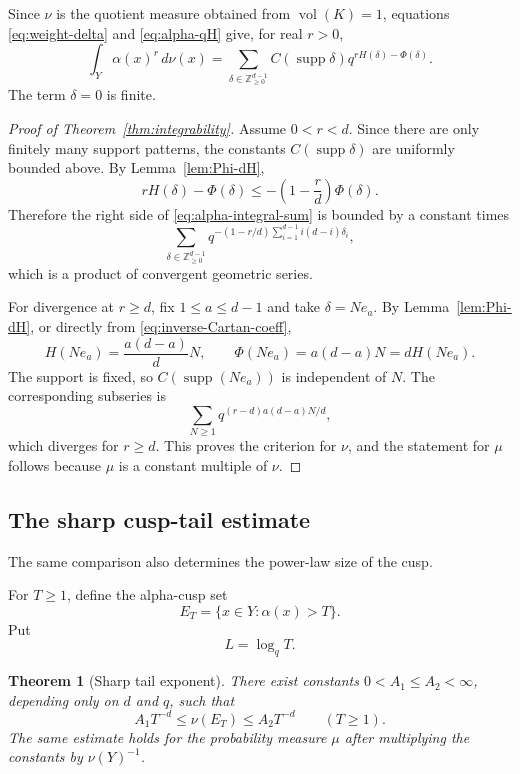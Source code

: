 \documentclass[11pt]{amsart}
\newcommand{\ZZ}{\mathbb Z}
\newcommand{\vol}{\operatorname{vol}}
\newcommand{\supp}{\operatorname{supp}}
\theoremstyle{plain}
\newtheorem{theorem}{Theorem}[section]
\theoremstyle{definition}
\numberwithin{equation}{section}
\begin{document}
Since $\nu$ is the quotient measure obtained from $\vol(K)=1$, equations
\eqref{eq:weight-delta} and \eqref{eq:alpha-qH} give, for real $r>0$,
\begin{equation}\label{eq:alpha-integral-sum}
  \int_Y\alpha(x)^r\,d\nu(x)
  =
  \sum_{\delta\in\ZZ_{\ge0}^{d-1}}
  C(\supp\delta)q^{rH(\delta)-\Phi(\delta)}.
\end{equation}
The term $\delta=0$ is finite.

\begin{proof}[Proof of Theorem~\ref{thm:integrability}]
Assume $0<r<d$.  Since there are only finitely many support patterns, the constants
$C(\supp\delta)$ are uniformly bounded above.  By Lemma~\ref{lem:Phi-dH},
\[
  rH(\delta)-\Phi(\delta)
  \le -\left(1-\frac rd\right)\Phi(\delta).
\]
Therefore the right side of \eqref{eq:alpha-integral-sum} is bounded by a constant times
\[
  \sum_{\delta\in\ZZ_{\ge0}^{d-1}}
  q^{-(1-r/d)\sum_{i=1}^{d-1}i(d-i)\delta_i},
\]
which is a product of convergent geometric series.

For divergence at $r\ge d$, fix $1\le a\le d-1$ and take $\delta=Ne_a$.  By
Lemma~\ref{lem:Phi-dH}, or directly from \eqref{eq:inverse-Cartan-coeff},
\[
  H(Ne_a)=\frac{a(d-a)}dN,
  \qquad
  \Phi(Ne_a)=a(d-a)N=dH(Ne_a).
\]
The support is fixed, so $C(\supp(Ne_a))$ is independent of $N$.  The corresponding
subseries is
\[
  \sum_{N\ge1}q^{(r-d)a(d-a)N/d},
\]
which diverges for $r\ge d$.  This proves the criterion for $\nu$, and the statement for
$\mu$ follows because $\mu$ is a constant multiple of $\nu$.
\end{proof}

\subsection{The sharp cusp-tail estimate}

The same comparison also determines the power-law size of the cusp.

For $T\ge1$, define the alpha-cusp set
\begin{equation}\label{eq:ET-def}
  E_T=\{x\in Y:\alpha(x)>T\}.
\end{equation}
Put
\begin{equation}\label{eq:L-def}
  L=\log_qT.
\end{equation}

\begin{theorem}[Sharp tail exponent]\label{thm:sharp-tail}
There exist constants $0<A_1\le A_2<\infty$, depending only on $d$ and $q$, such that
\begin{equation}\label{eq:sharp-tail}
  A_1T^{-d}\le \nu(E_T)\le A_2T^{-d}
  \qquad (T\ge1).
\end{equation}
The same estimate holds for the probability measure $\mu$ after multiplying the constants
by $\nu(Y)^{-1}$.
\end{theorem}
\end{document}
